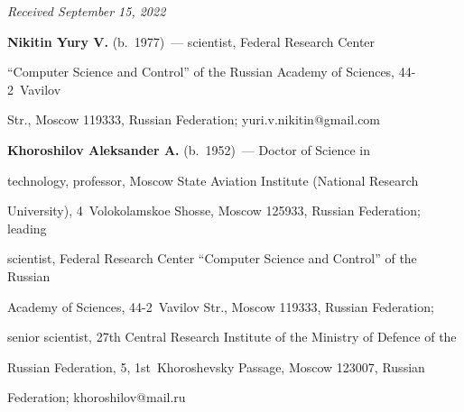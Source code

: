 \vspace*{-6pt}





\hfill{\small\textit{Received September 15, 2022}} 










  


  \Contr


  


  \noindent


  \textbf{Nikitin Yury V.} (b.\ 1977)~--- scientist, Federal Research Center 


``Computer Science and Control'' of the Russian Academy of Sciences, 44-2~Vavilov 


Str., Moscow 119333, Russian Federation; \mbox{yuri.v.nikitin@gmail.com}


  


  \vspace*{3pt}


  


  \noindent


  \textbf{Khoroshilov Aleksander A.} (b.\ 1952)~--- Doctor of Science in 


technology, professor, Moscow State Aviation Institute (National Research 


University), 4~Volokolamskoe Shosse, Moscow 125933, Russian Federation; leading 


scientist, Federal Research Center ``Computer Science and Control'' of the Russian 


Academy of Sciences, \mbox{44-2}~Vavilov Str., Moscow 119333, Russian Federation; 


senior scientist, 27th Central Research Institute of the Ministry of Defence of the 


Russian Federation, 5, 1st~Khoroshevsky Passage, Moscow 123007, Russian 


Federation; \mbox{khoroshilov@mail.ru}


  


  \vspace*{3pt}


